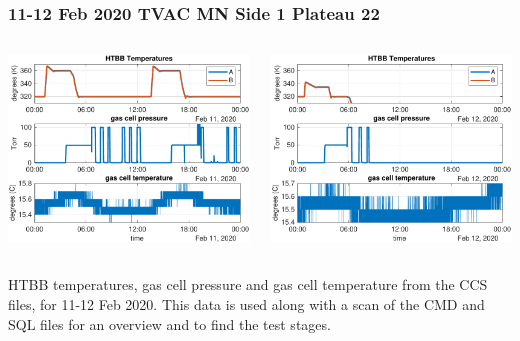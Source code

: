\documentclass[9pt]{beamer}
\begin{document}
\begin{frame}
\frametitle{11-12 Feb 2020 TVAC MN Side 1 Plateau 22}
\begin{columns}[t]
\begin{column}{0.5\textwidth}
  \begin{centering}
  \includegraphics[width=\textwidth]{harvest_02-11/css_summary_02_11.pdf}
  \end{centering}\vspace{3mm}

\end{column}
\begin{column}{0.5\textwidth}  
  \begin{centering}
  \includegraphics[width=\textwidth]{harvest_02-11/css_summary_02_12.pdf}
  \end{centering}\vspace{3mm}

\end{column}
\end{columns}

HTBB temperatures, gas cell pressure and gas cell temperature from
the CCS files, for 11-12 Feb 2020.  This data is used along with a
scan of the CMD and SQL files for an overview and to find the test
stages. 

\end{frame}
\end{document}
